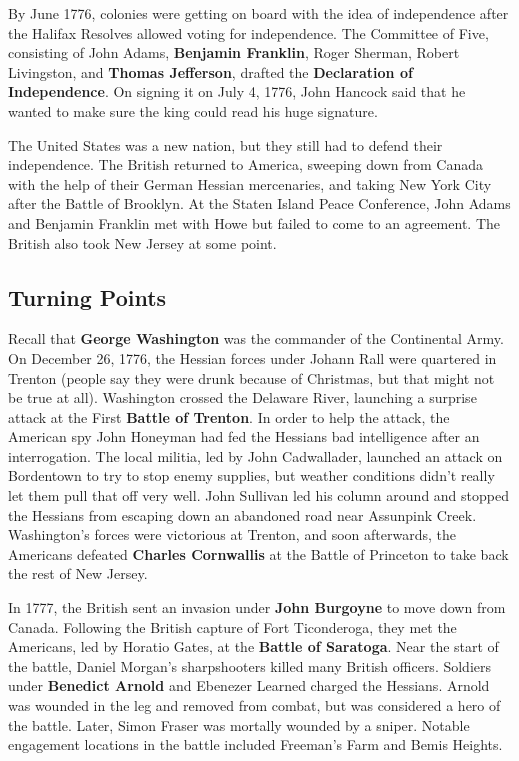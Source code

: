 By June 1776, colonies were getting on board with the idea of independence
after the Halifax Resolves allowed voting for independence.
The Committee of Five, consisting of
John Adams,
\textbf{Benjamin Franklin},
Roger Sherman,
Robert Livingston,
and \textbf{Thomas Jefferson},
drafted the \textbf{Declaration of Independence}.
On signing it on July 4, 1776,
John Hancock said that he wanted to make sure the king could read his huge signature.

The United States was a new nation, but they still had to defend their independence.
The British returned to America,
sweeping down from Canada with the help of their German Hessian mercenaries,
and taking New York City after the Battle of Brooklyn.
At the Staten Island Peace Conference, John Adams and Benjamin Franklin met with Howe
but failed to come to an agreement.
The British also took New Jersey at some point.

\subsection*{Turning Points}

Recall that \textbf{George Washington} was the commander of the Continental Army.
On December 26, 1776, the Hessian forces under Johann Rall were quartered in Trenton
(people say they were drunk because of Christmas, but that might not be true at all).
Washington crossed the Delaware River,
launching a surprise attack at the First \textbf{Battle of Trenton}.
In order to help the attack,
the American spy John Honeyman had fed the Hessians bad intelligence after an interrogation.
The local militia, led by John Cadwallader,
launched an attack on Bordentown to try to stop enemy supplies,
but weather conditions didn't really let them pull that off very well.
John Sullivan led his column around
and stopped the Hessians from escaping down an abandoned road near Assunpink Creek.
Washington's forces were victorious at Trenton,
and soon afterwards,
the Americans defeated \textbf{Charles Cornwallis}
at the Battle of Princeton to take back the rest of New Jersey.

In 1777, the British sent an invasion under \textbf{John Burgoyne} to move down from Canada.
Following the British capture of Fort Ticonderoga,
they met the Americans, led by Horatio Gates, at the \textbf{Battle of Saratoga}.
Near the start of the battle, Daniel Morgan's sharpshooters killed many British officers.
Soldiers under \textbf{Benedict Arnold} and Ebenezer Learned charged the Hessians.
Arnold was wounded in the leg and removed from combat, but was considered a hero of the battle.
Later, Simon Fraser was mortally wounded by a sniper.
Notable engagement locations in the battle included Freeman's Farm and Bemis Heights.

